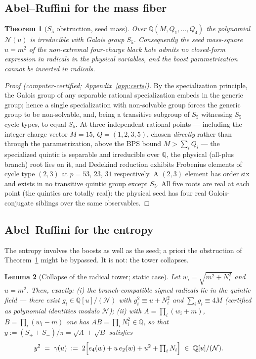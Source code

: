 \documentclass[11pt]{article}
\newtheorem{theorem}{Theorem}[section]
\newtheorem{lemma}[theorem]{Lemma}
\theoremstyle{definition}
\theoremstyle{remark}
\newcommand{\Q}{\mathbb{Q}}
\begin{document}
\subsection{Abel--Ruffini for the mass fiber}

\begin{theorem}[$S_5$ obstruction, seed mass]
\label{thm:S5}
Over $\Q(M,Q_1,\dots,Q_4)$ the polynomial $\mathcal N(u)$ is irreducible with
Galois group $S_5$. Consequently the seed mass-square $u=m^2$ of the
non-extremal four-charge black hole admits no closed-form expression in
radicals in the physical variables, and the boost parametrization cannot be
inverted in radicals.
\end{theorem}

\begin{proof}[Proof (computer-certified; Appendix~\ref{app:certs})]
By the specialization principle, the Galois group of any separable rational
specialization embeds in the generic group; hence a single specialization with
non-solvable group forces the generic group to be non-solvable, and, being a
transitive subgroup of $S_5$ witnessing $S_5$ cycle types, to equal $S_5$. At
three independent rational points --- including the integer charge vector
$M=15$, $Q=(1,2,3,5)$, chosen \emph{directly} rather than through the
parametrization, above the BPS bound $M>\sum_iQ_i$ --- the specialized quintic
is separable and irreducible over $\Q$, the physical (all-plus branch) root
lies on it, and Dedekind reduction exhibits Frobenius elements of cycle type
$(2,3)$ at $p=53$, $23$, $31$ respectively. A $(2,3)$ element has order six and
exists in no transitive quintic group except $S_5$. All five roots are real at
each point (the quintics are totally real): the physical seed has four real
Galois-conjugate siblings over the same observables.
\end{proof}

\subsection{Abel--Ruffini for the entropy}

The entropy involves the boosts as well as the seed; a priori the obstruction
of Theorem~\ref{thm:S5} might be bypassed. It is not: the tower collapses.

\begin{lemma}[Collapse of the radical tower; static case]
\label{lem:collapse}
Let $w_i=\sqrt{m^2+N_i^2}$ and $u=m^2$. Then, exactly:
\emph{(i)} the branch-compatible signed radicals lie in the quintic field ---
there exist $g_i\in\Q[u]/(\mathcal N)$ with $g_i^2\equiv u+N_i^2$ and
$\sum_i g_i\equiv 4M$ (certified as polynomial identities modulo
$\mathcal N$); \emph{(ii)} with $A=\prod_i(w_i+m)$, $B=\prod_i(w_i-m)$ one has
$AB=\prod_iN_i^2\in\Q$, so that $y:=(S_++S_-)/\pi=\sqrt A+\sqrt B$ satisfies
\begin{equation}
y^2 \;=\; \gamma(u)\;:=\;2\Bigl[e_4(w)+u\,e_2(w)+u^2+\textstyle\prod_iN_i\Bigr]
\;\in\;\Q[u]/(\mathcal N).
\end{equation}
\end{lemma}
\end{document}
